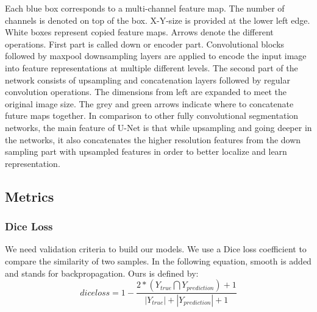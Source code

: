 Each blue box corresponds to a multi-channel feature map. The number of channels is denoted on top of the box. X-Y-size is provided at the lower left edge. White boxes represent copied feature maps. Arrows denote the different operations.\newline
First part is called down or encoder part. Convolutional blocks followed by maxpool downsampling layers are applied to encode the input image into feature representations at multiple different levels. The second part of the network consists of upsampling and concatenation layers followed by regular convolution operations. The dimensions from left are expanded to meet the original image size. The grey and green arrows indicate where to concatenate future maps together.\newline
In comparison to other fully convolutional segmentation networks, the main feature of U-Net  is that while upsampling and going deeper in the networks, it also concatenates the higher resolution features from the down sampling part with upsampled features in order to better localize and learn representation.\newline

\subsection{Metrics}\label{metrics_chapter}

\subsubsection{Dice Loss}
We need  validation criteria to build our models. We use a Dice loss coefficient to compare the similarity of two samples. In the following equation, smooth is added and stands for backpropagation. Ours is defined by: 
\begin{equation}
dice loss = 1 - \frac{2*(Y_{true} \bigcap Y_{prediction}) + 1}{|Y_{true}| + |Y_{prediction}| + 1}
\end{equation} 



